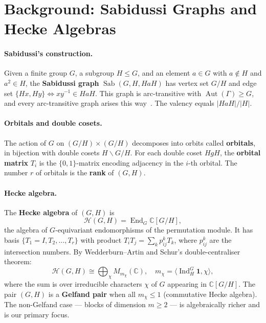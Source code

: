 \documentclass[mlmain]{jmlr}
\newcommand{\Sab}{\operatorname{Sab}}
\newcommand{\Aut}{\operatorname{Aut}}
\newcommand{\HH}{\mathcal{H}}
\newcommand{\CC}{\mathbb{C}}
\begin{document}
\section{Background: Sabidussi Graphs and Hecke Algebras}
\label{sec:background}

\paragraph{Sabidussi's construction.}
Given a finite group $G$, a subgroup $H \leq G$, and an
element $a \in G$ with $a \notin H$ and $a^2 \in H$, the
\textbf{Sabidussi graph} $\Sab(G, H, HaH)$ has vertex set
$G/H$ and edge set $\{Hx, Hy\} \Leftrightarrow xy^{-1} \in HaH$.
This graph is arc-transitive with $\Aut(\Gamma) \geq G$,
and every arc-transitive graph arises this
way~\citep{sabidussi1964, lorimer1984, anon2013}.
The valency equals $|HaH|/|H|$.

\paragraph{Orbitals and double cosets.}
The action of $G$ on $(G/H) \times (G/H)$ decomposes into
orbits called \textbf{orbitals}, in bijection with double
cosets $H \backslash G / H$.  For each double coset $HgH$,
the \textbf{orbital matrix} $T_i$ is the $\{0,1\}$-matrix
encoding adjacency in the $i$-th orbital.  The number $r$
of orbitals is the \textbf{rank} of $(G,H)$.

\paragraph{Hecke algebra.}
The \textbf{Hecke algebra} of $(G,H)$ is
\begin{equation}
\label{eq:hecke}
  \HH(G,H) = \operatorname{End}_G \CC[G/H],
\end{equation}
the algebra of $G$-equivariant endomorphisms of the permutation
module.  It has basis $\{T_1 = I, T_2, \ldots, T_r\}$ with
product $T_i T_j = \sum_k p_{ij}^k T_k$, where $p_{ij}^k$
are the intersection numbers.
By Wedderburn--Artin and Schur's double-centraliser theorem:
\begin{equation}
\label{eq:wedderburn}
  \HH(G,H) \cong \bigoplus_\chi M_{m_\chi}(\CC),
  \quad m_\chi = \langle \operatorname{Ind}_H^G \mathbf{1}, \chi \rangle,
\end{equation}
where the sum is over irreducible characters $\chi$ of $G$
appearing in $\CC[G/H]$.  The pair $(G,H)$ is a \textbf{Gelfand pair}
when all $m_\chi \leq 1$ (commutative Hecke algebra).  The
non-Gelfand case --- blocks of dimension $m \geq 2$ ---
is algebraically richer and is our primary focus.
\end{document}
